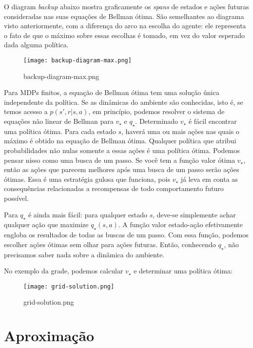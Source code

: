 \documentclass{article}
\begin{document}
O diagram \textit{backup} abaixo mostra graficamente os \textit{spans} de estados e ações futuras consideradas nas suas equações de Bellman ótima. São semelhantes ao diagrama visto anteriormente, com a diferença do arco na escolha do agente: ele representa o fato de que o máximo sobre essas escolhas é tomado, em vez do valor esperado dada alguma política.

\begin{figure}[htpb]
  \centering
  \texttt{[image: backup-diagram-max.png]}
  \caption{backup-diagram-max.png}
  \label{fig:backup-diagram-max-png}
\end{figure}

Para MDPs finitos, a equação de Bellman ótima tem uma solução única independente da política. Se as dinâmicas do ambiente são conhecidas, isto é, se temos acesso a $p(s',r|s,a)$, em princípio, podemos resolver o sistema de equações não linear de Bellman para $v_{\star}$ e $q_{\star}$. Determinado $v_{\star}$ é fácil encontrar uma política ótima. Para cada estado $s$, haverá uma ou mais ações nas quais o máximo é obtido na equação de Bellman ótima. Qualquer política que atribui probabilidades não nulas somente a essas ações é uma política ótima. Podemos pensar nisso como uma busca de um passo. Se você tem a função valor ótima $v_{\star}$, então as ações que parecem melhores após uma busca de um passo serão ações ótimas. Essa é uma estratégia gulosa que funciona, pois $v_{\star}$ já leva em conta as consequências relacionadas a recompensas de todo comportamento futuro possível. 

Para $q_{\star}$ é ainda mais fácil: para qualquer estado $s$, deve-se simplemente achar qualquer ação que maximize $q_{\star}(s,a)$. A função valor estado-ação efetivamente engloba os resultados de todas as buscas de um passo. Com essa função, podemos escolher ações ótimas sem olhar para ações futuras. Então, conhecendo $q_{\star}$, não precisamos saber nada sobre a dinâmica do ambiente.

No exemplo da grade, podemos calcular $v_{\star}$ e determinar uma política ótima:

\begin{figure}[htpb]
  \centering
  \texttt{[image: grid-solution.png]}
  \caption{grid-solution.png}
  \label{fig:grid-solution-png}
\end{figure}


\section{Aproximação}
\end{document}
